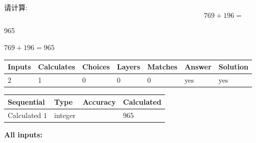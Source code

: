 \documentclass{ctexart}
\begin{document}
请计算:
\begin{equation}
769 +  %
196 = \nonumber
\end{equation}
 
 
 
\noindent{}
 
 

965
 
 
\noindent{}
 
 

 
 
 
\noindent{}
 
 

$ %
769 +  %
196=   %
965$
 
 
\noindent{}
 
 

 
   
   
   
   
\noindent\begin{tabular}{|l|l|l|l|l|l|l|}
 \hline
Inputs & Calculates & Choices & Layers & Matches & Answer & Solution \\ \hline
 2  & 
 1  & 
 0
  & 
 0  & 
 0  & 
  yes & 
  yes 
  \\ \hline
 \end{tabular}
   
   
   
   
\noindent{}
   
   
  
  
\noindent\begin{tabular}{|l|l|l|l|}
\hline
 Sequential & Type & Accuracy & Calculated \\ 
\hline
 
 
  Calculated $  1 $ & integer &  & 
  $ 965 $ 
 \\  \hline  
 \end{tabular}
   
   
   
   
\noindent\vspace{0.1in}\hspace{-0.08in} {\textbf{\Large{All inputs: }}}
   
   
  
\end{document}
